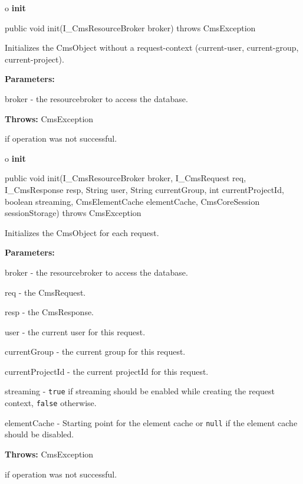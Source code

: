 o {\bf init} 

\begin{PRE}
 public void init(I\_CmsResourceBroker broker) throws CmsException
\end{PRE}

\begin{description}
\htmlDD Initializes the CmsObject without a request-context (current-user,
current-group, current-project). 

\begin{description}
\item {\bf Parameters:}  

broker - the resourcebroker to access the database.  
\item {\bf Throws:} CmsException  

if operation was not successful.  
\end{description}

\end{description}

o {\bf init} 

\begin{PRE}
 public void init(I\_CmsResourceBroker broker,
                  I\_CmsRequest req,
                  I\_CmsResponse resp,
                  String user,
                  String currentGroup,
                  int currentProjectId,
                  boolean streaming,
                  CmsElementCache elementCache,
                  CmsCoreSession sessionStorage) throws CmsException
\end{PRE}

\begin{description}
\htmlDD Initializes the CmsObject for each request. 

\begin{description}
\item {\bf Parameters:}  

broker - the resourcebroker to access the database.  

req - the CmsRequest.  

resp - the CmsResponse.  

user - the current user for this request.  

currentGroup - the current group for this request.  

currentProjectId - the current projectId for this request.  

streaming - {\tt true} if streaming should be enabled while creating the
request context, {\tt false} otherwise.  

elementCache - Starting point for the element cache or {\tt null} if the
element cache should be disabled.  
\item {\bf Throws:} CmsException  

if operation was not successful.  
\end{description}

\end{description}

